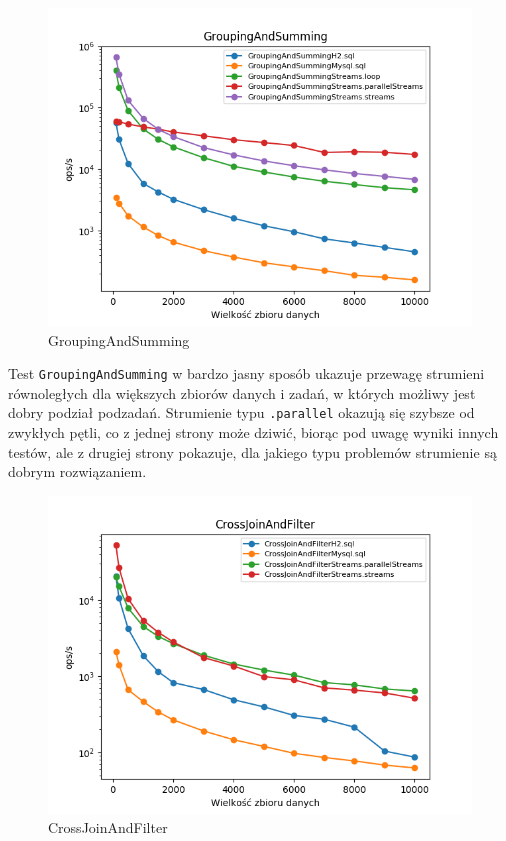 \documentclass[12pt,twoside,openright]{extarticle}
\begin{document}
\newpage
\begin{figure}[H]
\centering
\includegraphics[width=15cm]{plots/GroupingAndSumming}
\caption{GroupingAndSumming}
\end{figure}

    Test \texttt{GroupingAndSumming} w bardzo jasny sposób ukazuje przewagę strumieni równoległych dla większych zbiorów danych i zadań, w których możliwy jest dobry podział podzadań. Strumienie typu \texttt{.parallel} okazują się szybsze od zwykłych pętli, co z jednej strony może dziwić, biorąc pod uwagę wyniki innych testów, ale z drugiej strony pokazuje, dla jakiego typu problemów strumienie są dobrym rozwiązaniem.

\newpage
\begin{figure}[H]
\centering
\includegraphics[width=15cm]{plots/CrossJoinAndFilter}
\caption{CrossJoinAndFilter}
\end{figure}
\end{document}
